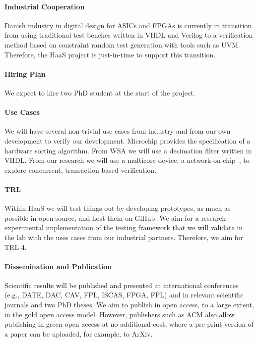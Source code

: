\documentclass[fleqn,12pt]{article}
\begin{document}
\paragraph*{Industrial Cooperation}

Danish industry in digital design for ASICs and FPGAs is currently in transition from using traditional
test benches written in VHDL and Verilog to a verification method based on constraint random
test generation with tools such as UVM. Therefore, the HaaS project is just-in-time to support this
transition.

\paragraph{Hiring Plan} We expect to hire two PhD student at the start of the project.

\paragraph*{Use Cases}

We will have several non-trivial use cases from industry and from our own development to verify
our development.
Microchip provides the specification of a hardware sorting algorithm.
From WSA we will use a decimation filter written in VHDL.
From our research we will use a multicore device, a network-on-chip~\cite{s4noc:nocarc2019},
to explore concurrent, transaction based verification.

\paragraph*{TRL} Within HaaS we will test things out by developing prototypes, as much as possible
in open-source, and host them on GiHub. We aim for a research experimental  implementation 
of the testing framework that we will validate in the lab with the uses cases from our
industrial partners. Therefore, we aim for TRL 4.


\paragraph*{Dissemination and Publication}

Scientific results will be published and presented at international
conferences (e.g., DATE, DAC, CAV, FPL, ISCAS, FPGA, FPL) and in relevant scientific journals
and two PhD theses.
We aim to publish in open access, to a large extent, in the gold open access model.
However, publishers such as ACM also allow publishing in green open access
at no additional cost, where a pre-print version of a paper can be uploaded,
for example, to ArXiv.
\end{document}
